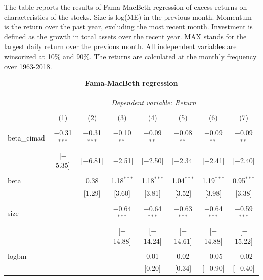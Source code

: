 \documentclass[12pt]{article}
\begin{document}
\begin{table}[!htbp] \centering 
  \caption{\textbf{Fama-MacBeth regression}} 
  \label{} 
  \begin{flushleft}
    {\medskip\small
 The table reports the results of Fama-MacBeth regression of excess returns on characteristics of the stocks. Size is log(ME) in the previous month. Momentum is the return over the past year, excluding the most recent month. Investment is defined as the growth in total assets over the recent year. MAX stands for the largest daily return over the previous month. All independent variables are winsorized at 10\% and 90\%. The returns are calculated at the monthly frequency over 1963-2018.}
    \medskip
    \end{flushleft}
\begin{tabular}{@{\extracolsep{0pt}}lccccccc} 
\\[-1.8ex]\hline 
\hline \\[-1.8ex] 
 & \multicolumn{7}{c}{\textit{Dependent variable: Return}} \\ 
\cline{2-8} 
\\[-1.8ex] & (1) & (2) & (3) & (4) & (5) & (6) & (7)\\ 
\hline \\[-1.8ex] 
 beta\_cimad & $-$0.31$^{***}$ & $-$0.31$^{***}$ & $-$0.10$^{**}$ & $-$0.09$^{**}$ & $-$0.08$^{**}$ & $-$0.09$^{**}$ & $-$0.09$^{**}$ \\ 
  & [$-$5.35] & [$-$6.81] & [$-$2.51] & [$-$2.50] & [$-$2.34] & [$-$2.41] & [$-$2.40] \\ 
  & & & & & & & \\ 
 beta &  & 0.38 & 1.18$^{***}$ & 1.18$^{***}$ & 1.04$^{***}$ & 1.19$^{***}$ & 0.95$^{***}$ \\ 
  &  & [1.29] & [3.60] & [3.81] & [3.52] & [3.98] & [3.38] \\ 
  & & & & & & & \\ 
 size &  &  & $-$0.64$^{***}$ & $-$0.64$^{***}$ & $-$0.63$^{***}$ & $-$0.64$^{***}$ & $-$0.59$^{***}$ \\ 
  &  &  & [$-$14.88] & [$-$14.24] & [$-$14.61] & [$-$14.88] & [$-$15.22] \\ 
  & & & & & & & \\ 
 logbm &  &  &  & 0.01 & 0.02 & $-$0.05 & $-$0.02 \\ 
  &  &  &  & [0.20] & [0.34] & [$-$0.90] & [$-$0.40] \\ 

\end{tabular}
\end{table}
\end{document}
